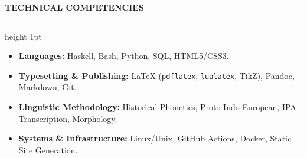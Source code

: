 \documentclass[10pt,letterpaper]{article}
\newcommand{\cvsection}[1]{%
    \vspace{10pt}%
    {\large\bfseries\uppercase{#1}}%
    \vspace{2pt}%
    \hrule height 1pt%
    \vspace{6pt}%
}
\begin{document}
\cvsection{Technical Competencies}
\begin{itemize}
    \item \textbf{Languages:} Haskell, Bash, Python, SQL, HTML5/CSS3.
    \item \textbf{Typesetting \& Publishing:} LaTeX (\texttt{pdflatex}, \texttt{lualatex}, TikZ), Pandoc, Markdown, Git.
    \item \textbf{Linguistic Methodology:} Historical Phonetics, Proto-Indo-European, IPA Transcription, Morphology.
    \item \textbf{Systems \& Infrastructure:} Linux/Unix, GitHub Actions, Docker, Static Site Generation.
\end{itemize}
\end{document}

